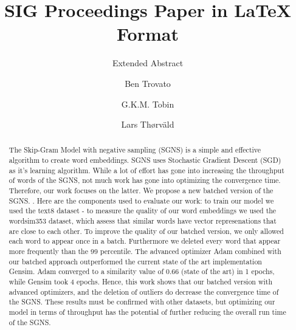 \documentclass[sigconf]{acmart}
\begin{document}
\title{SIG Proceedings Paper in LaTeX Format}
\subtitle{Extended Abstract}


\author{Ben Trovato}

\author{G.K.M. Tobin}


\author{Lars Th{\o}rv{\"a}ld}


\renewcommand{\shortauthors}{B. Trovato et al.}


\begin{abstract}
The Skip-Gram Model with negative sampling (SGNS) is a simple and effective algorithm to create word embeddings. SGNS uses Stochastic Gradient Descent (SGD) as it's learning algorithm. While a lot of effort has gone into increasing the throughput of words of the SGNS, not much work has gone into optimizing the convergence time. Therefore, our work focuses on the latter. We propose a new batched version of the SGNS.  . Here are the components used to evaluate our work: to train our model we used the text8 dataset - to measure the quality of our word embeddings we used the wordsim353 dataset, which assess that similar words have vector represenations that are close to each other. To improve the quality of our batched version, we only allowed each word to appear once in a batch. Furthermore we deleted every word that appear more frequently than the 99 percentile. The advanced optimizer Adam combined with our batched approach outperformed the current state of the art implementation Gensim. Adam converged to a similarity value of 0.66 (state of the art) in 1 epochs, while Gensim took 4 epochs. Hence, this work shows that our batched version with advanced optimizers, and the deletion of outliers do decrease the convergence time of the SGNS. These results must be confirmed with other datasets, but optimizing our model in terms of throughput has the potential of further reducing the overall run time of the SGNS.


\end{abstract}
\end{document}
